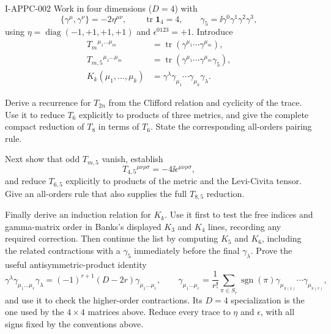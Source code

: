 \begin{exercise}{I-APPC-002}
Work in four dimensions ($D=4$) with
\[
 \{\gamma^\mu,\gamma^\nu\}=-2\eta^{\mu\nu},
 \qquad \operatorname{tr}\mathbf 1_4=4,
 \qquad \gamma_5=\ii\gamma^0\gamma^1\gamma^2\gamma^3,
\]
using $\eta=\operatorname{diag}(-1,+1,+1,+1)$ and
$\epsilon^{0123}=+1$.  Introduce
\begin{align*}
 T_m{}^{\mu_1\ldots\mu_m}
   &=\operatorname{tr}(\gamma^{\mu_1}\cdots\gamma^{\mu_m}),\\
 T_{m,5}{}^{\mu_1\ldots\mu_m}
   &=\operatorname{tr}(\gamma^{\mu_1}\cdots\gamma^{\mu_m}\gamma_5),\\
 K_k(\mu_1,\ldots,\mu_k)
   &=\gamma^\lambda\gamma_{\mu_1}\cdots\gamma_{\mu_k}\gamma_\lambda.
\end{align*}

Derive a recurrence for $T_{2n}$ from the Clifford relation and cyclicity
of the trace.  Use it to reduce $T_6$ explicitly to products of three
metrics, and give the complete compact reduction of $T_8$ in terms of
$T_6$.  State the corresponding all-orders pairing rule.

Next show that odd $T_{m,5}$ vanish, establish
\[
 T_{4,5}{}^{\mu\nu\rho\sigma}=-4\ii\epsilon^{\mu\nu\rho\sigma},
\]
and reduce $T_{6,5}$ explicitly to products of the metric and the
Levi-Civita tensor.  Give an
all-orders rule that also supplies the full $T_{8,5}$ reduction.

Finally derive an induction relation for $K_k$.  Use it first to test the
free indices and gamma-matrix order in Banks's displayed $K_3$ and $K_4$
lines, recording any required correction.  Then continue the list by
computing $K_5$ and $K_6$, including the related contractions with a
$\gamma_5$ immediately before the final $\gamma_\lambda$.  Prove the useful
antisymmetric-product identity
\[
 \gamma^\lambda\gamma_{\mu_1\ldots\mu_r}\gamma_\lambda
 =(-1)^{r+1}(D-2r)\gamma_{\mu_1\ldots\mu_r},
 \qquad
 \gamma_{\mu_1\ldots\mu_r}
 =\frac1{r!}\sum_{\pi\in S_r}\operatorname{sgn}(\pi)
 \gamma_{\mu_{\pi(1)}}\cdots\gamma_{\mu_{\pi(r)}},
\]
and use it to check the higher-order contractions.  Its $D=4$ specialization
is the one used by the $4\times4$ matrices above. Reduce every trace to
$\eta$ and $\epsilon$, with all signs fixed by the conventions above.
\end{exercise}
